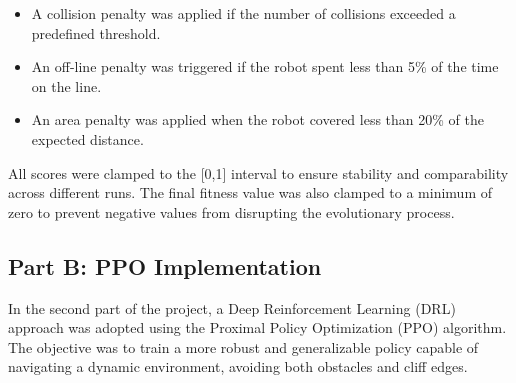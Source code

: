 \documentclass[final,5p,times,twocolumn,authoryear]{elsarticle}
\begin{document}
\begin{itemize}
    \item A collision penalty was applied if the number of collisions exceeded a predefined threshold.

    \item An off-line penalty was triggered if the robot spent less than 5\% of the time on the line.

    \item An area penalty was applied when the robot covered less than 20\% of the expected distance.
\end{itemize}

All scores were clamped to the 
[0,1] interval to ensure stability and comparability across different runs. The final fitness value was also clamped to a minimum of zero to prevent negative values from disrupting the evolutionary process.









\subsection{Part B: PPO Implementation}

In the second part of the project, a Deep Reinforcement Learning (DRL) approach was adopted using the Proximal Policy Optimization (PPO) algorithm. The objective was to train a more robust and generalizable policy capable of navigating a dynamic environment, avoiding both obstacles and cliff edges.
\end{document}
